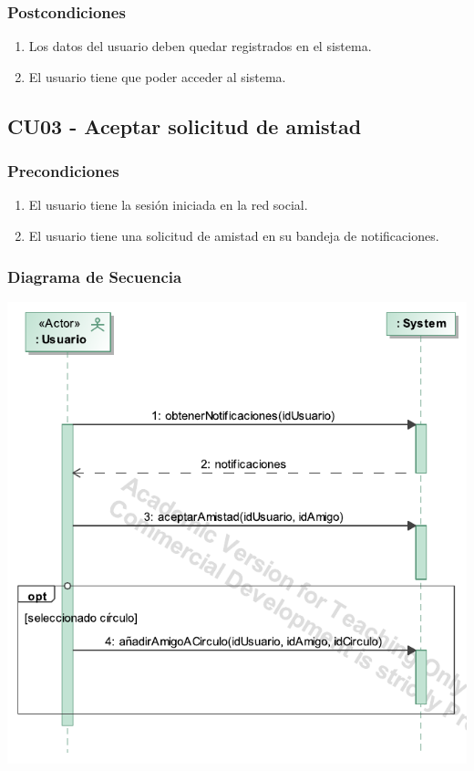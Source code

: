 \documentclass[12pt, a4paper, titlepage]{article}
\begin{document}
\subsubsection{Postcondiciones}
\begin{enumerate}
	\item Los datos del usuario deben quedar registrados en el sistema.
	\item El usuario tiene que poder acceder al sistema.
\end{enumerate}


\subsection{CU03 - Aceptar solicitud de amistad}

\subsubsection{Precondiciones}
\begin{enumerate}
	\item El usuario tiene la sesión iniciada en la red social.
	\item El usuario tiene una solicitud de amistad en su bandeja de notificaciones.
\end{enumerate}

\subsubsection{Diagrama de Secuencia}
\begin{center}
	\includegraphics[width=\textwidth]{Imagenes/Aceptar_solicitud_de_amistad}
\end{center}
\end{document}
